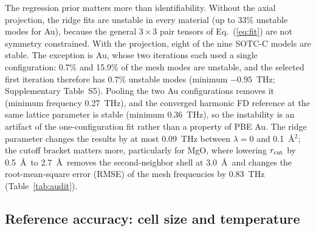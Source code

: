 \documentclass[aip,jap,reprint,amsmath,amssymb,floatfix]{revtex4-2}
\begin{document}
The regression prior matters more than identifiability. Without the axial
projection, the ridge fits are unstable in every material (up to 33\% unstable
modes for Au), because the general $3\times3$ pair tensors of
Eq.~(\ref{eq:fit}) are not symmetry constrained. With the projection, eight of
the nine SOTC-C models are stable. The exception is Au, whose two iterations
each used a single configuration: 0.7\% and 15.9\% of the mesh modes are
unstable, and the selected first iteration therefore has 0.7\% unstable
modes (minimum $-0.95$~THz; Supplementary Table~S5). Pooling
the two Au configurations removes it (minimum frequency 0.27~THz), and the
converged harmonic FD reference at the same lattice parameter is stable
(minimum 0.36~THz), so the instability is an artifact of the one-configuration
fit rather than a property of PBE Au. The ridge parameter changes the results
by at most 0.09~THz between $\lambda=0$ and 0.1~\AA$^2$; the cutoff bracket
matters more, particularly for MgO, where lowering $r_{\rm cut}$ by 0.5~\AA\
to 2.7~\AA\ removes the second-neighbor shell at 3.0~\AA\ and changes the
root-mean-square error (RMSE) of the mesh frequencies by 0.83~THz (Table~\ref{tab:audit}).



\subsection{Reference accuracy: cell size and temperature}\label{sec:accuracy}
\end{document}
